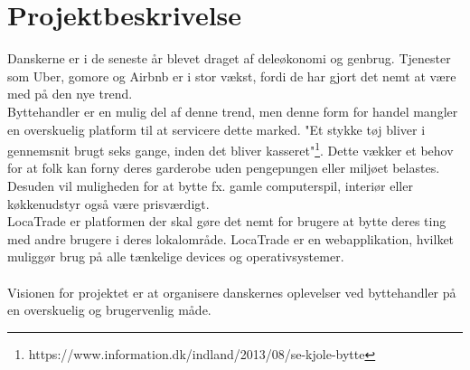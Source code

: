 \chapter{Projektbeskrivelse}\label{ch:Projektbeskrivelse}
Danskerne er i de seneste år blevet draget af deleøkonomi og genbrug. Tjenester som Uber, gomore og Airbnb er i stor vækst, fordi de har gjort det nemt at være med på den nye trend. \\Byttehandler er en mulig del af denne trend, men denne form for handel mangler en overskuelig platform til at servicere dette marked. "Et stykke tøj bliver i gennemsnit brugt seks gange, inden det bliver kasseret"\footnote{https://www.information.dk/indland/2013/08/se-kjole-bytte}. Dette vækker et behov for at folk kan forny deres garderobe uden pengepungen eller miljøet belastes. Desuden vil muligheden for at bytte fx. gamle computerspil, interiør eller køkkenudstyr også være prisværdigt. \\
LocaTrade er platformen der skal gøre det nemt for brugere at bytte deres ting med andre brugere i deres lokalområde. LocaTrade er en webapplikation, hvilket muliggør brug på alle tænkelige devices og operativsystemer. \\ \\
Visionen for projektet er at organisere danskernes oplevelser ved byttehandler på en overskuelig og brugervenlig måde. 




